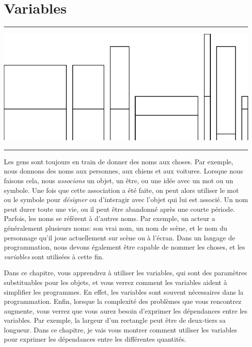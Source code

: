 \documentclass[a4paper,10pt,twoside]{book}
\begin{document}
    \sloppy
\fi

\chapter{Variables}\label{cha:variables}

\noindent\hrule
\includegraphics[width=0.9\linewidth]{varTitlePicture}
\noindent\hrule\vspace{1.5cm}

Les gens sont toujours en train de donner des noms aux choses. Par exemple, nous donnons des noms aux personnes, aux chiens et aux voitures. Lorsque nous faisons cela, nous \emph{associons} un objet, un \^etre, ou une id\'ee avec un mot ou un symbole. Une fois que cette association a \'et\'e faite, on peut alors utiliser le mot ou le symbole pour \emph{d\'esigner} ou d'interagir avec l'objet qui lui est associ\'e. Un nom peut durer toute une vie, ou il peut \^etre abandonn\'e apr\`es une courte p\'eriode. Parfois, les noms se r\'ef\`erent \`a d'autres noms. Par exemple, un acteur a g\'en\'eralement plusieurs noms: son vrai nom, un nom de sc\`ene, et le nom du personnage qu'il joue actuellement sur sc\`ene ou \`a l'\'ecran. Dans un langage de programmation, nous devons \'egalement \^etre capable de nommer les choses, et les \emph{variables} sont utilis\'ees \`a cette fin. 

Dans ce chapitre, vous apprendrez \`a utiliser les variables, qui sont des param\`etres substituables   pour les objets, et vous verrez comment les variables aident \`a simplifier les programmes. En effet, les variables sont souvent n\'ecessaires dans la programmation. Enfin, lorsque la complexit\'e des probl\`emes que vous rencontrez augmente, vous verrez que vous aurez besoin d'exprimer les d\'ependances entre les variables. Par exemple, la largeur d'un rectangle peut \^etre de deux-tiers sa longueur. Dans ce chapitre, je vais vous montrer comment utiliser les variables pour exprimer les d\'ependances entre les diff\'erentes quantit\'es. 
\end{document}
